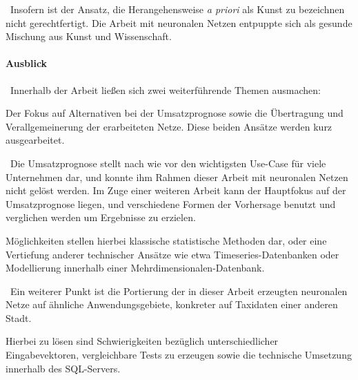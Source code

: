 ~\newline Insofern ist der Ansatz, die Herangehensweise \textit{a priori} als Kunst zu bezeichnen nicht gerechtfertigt. Die Arbeit mit neuronalen Netzen entpuppte sich als gesunde Mischung aus Kunst und Wissenschaft. 

\paragraph{Ausblick}~\newline Innerhalb der Arbeit ließen sich zwei weiterführende Themen ausmachen: 

Der Fokus auf Alternativen bei der Umsatzprognose sowie die Übertragung und Verallgemeinerung der erarbeiteten Netze. Diese beiden Ansätze werden kurz ausgearbeitet. 

~\newline Die Umsatzprognose stellt nach wie vor den wichtigsten Use-Case für viele Unternehmen dar, und konnte ihm Rahmen dieser Arbeit mit neuronalen Netzen nicht gelöst werden. Im Zuge einer weiteren Arbeit kann der Hauptfokus auf der Umsatzprognose liegen, und verschiedene Formen der Vorhersage benutzt und verglichen werden um Ergebnisse zu erzielen. 

Möglichkeiten stellen hierbei klassische statistische Methoden dar, oder eine Vertiefung anderer technischer Ansätze wie etwa Timeseries-Datenbanken oder Modellierung innerhalb einer Mehrdimensionalen-Datenbank.

~\newline Ein weiterer Punkt ist die Portierung der in dieser Arbeit erzeugten neuronalen Netze auf ähnliche Anwendungsgebiete, konkreter auf Taxidaten einer anderen Stadt. 

Hierbei zu lösen sind Schwierigkeiten bezüglich unterschiedlicher Eingabevektoren, vergleichbare Tests zu erzeugen sowie die technische Umsetzung innerhalb des SQL-Servers.  
